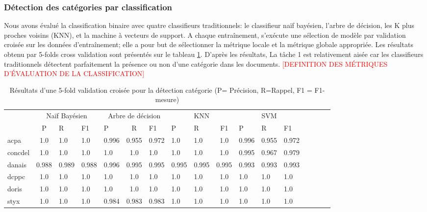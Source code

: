 \subsubsection{Détection des catégories par classification}

Nous avons évalué la classification binaire avec quatre classifieurs traditionnels: le classifieur naïf bayésien, l'arbre de décision, les K plus proches voisins (KNN), et la machine à vecteurs de support. A chaque entraînement, s'exécute une sélection de modèle par validation croisée sur les données d'entraînement; elle a pour but de sélectionner la métrique locale et la métrique globale appropriée. Les résultats obtenu par 5-folds cross validation sont présentés sur le tableau \ref{tab:quanta:resultat-detect-cat}.  D'après les résultats, La tâche 1 est relativement aisée car les classifieurs traditionnels détectent parfaitement la présence ou non d'une catégorie dans les documents. \textcolor{red}{[DEFINITION DES MÉTRIQUES D'ÉVALUATION DE LA CLASSIFICATION]}

\begin{table}[!h]
	\scriptsize
	\centering
	\begin{tabular}{l|c@{\hskip 0.1in}lllc@{\hskip 0.1in}lllc@{\hskip 0.1in}lllc@{\hskip 0.1in}lll}
		\hline\noalign{\smallskip}
		&   \multicolumn{3}{c}{Naïf Bayésien}    &    \multicolumn{3}{c}{Arbre de décision}   &  \multicolumn{3}{c}{KNN}  & \multicolumn{3}{c}{SVM}     \\       
		\noalign{\smallskip}
		\hline
		\noalign{\smallskip}
		& P     & R     & F1    & P     & R     & F1    & P     & R     & F1    & P     & R     & F1    \\        
		\noalign{\smallskip}
		\hline
		\noalign{\smallskip}
		acpa    & 1.0 & 1.0 & 1.0 & 0.996 & 0.955 & 0.972 & 1.0 & 1.0 & 1.0 & 0.996 & 0.955 & 0.972 \\
		concdel & 1.0 & 1.0 & 1.0 & 1.0 & 1.0 & 1.0 & 1.0 & 1.0 & 1.0 & 0.995 & 0.967 & 0.979 \\
		danais  & 0.988 & 0.989 & 0.988 & 0.996 & 0.995 & 0.995 & 0.995 & 0.995 & 0.995 & 0.993 & 0.993 & 0.993 \\
		dcppc   & 1.0 & 1.0 & 1.0 & 1.0 & 1.0 & 1.0 & 1.0 & 1.0 & 1.0 & 1.0 & 1.0 & 1.0 \\
		doris   & 1.0 & 1.0 & 1.0 & 1.0 & 1.0 & 1.0 & 1.0 & 1.0 & 1.0 & 1.0 & 1.0 & 1.0 \\
		styx    & 1.0 & 1.0 & 1.0 & 0.984 & 0.983 & 0.983 & 1.0 & 1.0 & 1.0 & 1.0 & 1.0 & 1.0 \\
		\hline
	\end{tabular}
	\caption{Résultats d'une 5-fold validation croisée pour la détection catégorie  (P= Précision, R=Rappel, F1 = F1-mesure)}\label{tab:quanta:resultat-detect-cat}
\end{table}

